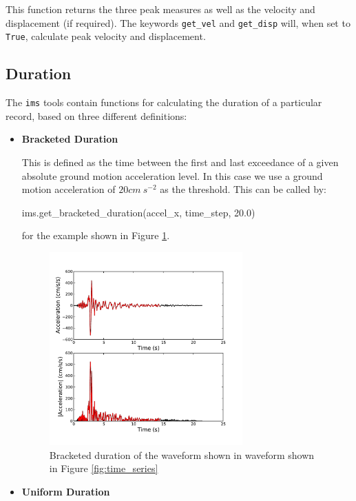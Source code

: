 \noindent This function returns the three peak measures as well as the velocity and displacement (if required). The keywords \verb=get_vel= and \verb=get_disp= will, when set to \verb=True=, calculate peak velocity and displacement.

\subsection{Duration}

The \verb=ims= tools contain functions for calculating the duration of a particular record, based on three different definitions:

\begin{itemize}
\item \textbf{Bracketed Duration}

This is defined as the time between the first and last exceedance of a given absolute ground motion acceleration level. In this case we use a ground motion acceleration of $20 cm\ s^{-2}$ as the threshold. This can be called by:
\begin{python}
ims.get_bracketed_duration(accel_x, time_step, 20.0)
\end{python}

\noindent for the example shown in Figure \ref{fig:bracketed}.
\begin{figure}[htb]
	\centering
		\includegraphics[width=0.7\textwidth]{./figures/ims/bracked_duration.pdf}
	\caption{Bracketed duration of the waveform shown in waveform shown in Figure \ref{fig:time_series}}
	\label{fig:bracketed}
\end{figure}


\item \textbf{Uniform Duration}


\end{itemize}
